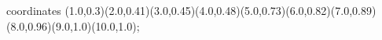 					coordinates { (1.0,0.3)(2.0,0.41)(3.0,0.45)(4.0,0.48)(5.0,0.73)(6.0,0.82)(7.0,0.89)(8.0,0.96)(9.0,1.0)(10.0,1.0)};